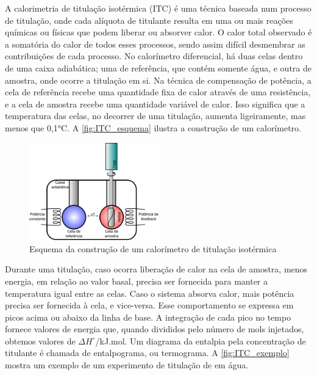 		A calorimetria de titulação isotérmica (ITC) é uma técnica baseada num processo de titulação, onde cada alíquota de titulante resulta em uma ou mais reações químicas ou físicas que podem liberar ou absorver calor. O calor total observado é a somatória do calor de todos esses processos, sendo assim difícil desmembrar as contribuições de cada processo.\cite{Loh2016} No calorímetro diferencial, há duas celas dentro de uma caixa adiabática; uma de referência, que contém somente água, e outra de amostra, onde ocorre a titulação em si.\cite{Bouchemal2010a} Na técnica de compensação de potência, a cela de referência recebe uma quantidade fixa de calor através de uma resistência, e a cela de amostra recebe uma quantidade variável de calor. Isso significa que a temperatura das celas, no decorrer de uma titulação, aumenta ligeiramente, mas menos que 0,1°C. A \autoref{fig:ITC_esquema} ilustra a construção de um calorímetro.
		
		\begin{figure}[h]
			\centering
			\includegraphics[width=0.5\textwidth]{./imagens/itc/esquema_itc_equipamento}
			\caption{Esquema da construção de um calorímetro de titulação isotérmica}
			\label{fig:ITC_esquema}
		\end{figure} 
		
		Durante uma titulação, caso ocorra liberação de calor na cela de amostra, menos energia, em relação ao valor basal, precisa ser fornecida para manter a temperatura igual entre as celas. Caso o sistema absorva calor, mais potência precisa ser fornecida à cela, e vice-versa. Esse comportamento se expressa em picos acima ou abaixo da linha de base. A integração de cada pico no tempo fornece valores de energia que, quando divididos pelo número de mols injetados, obtemos valores de \(\Delta H^\circ\)/kJ.mol\menosUm. Um diagrama da entalpia pela concentração de titulante é chamada de entalpograma, ou termograma.\cite{Bouchemal2010a} A \autoref{fig:ITC_exemplo} mostra um exemplo de um experimento de titulação de \TTAB{} em água.
		
